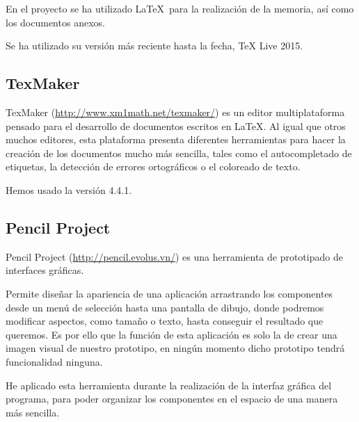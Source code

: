 En el proyecto se ha utilizado \LaTeX\ para la realización de la memoria, así como los documentos anexos.

Se ha utilizado su versión más reciente hasta la fecha, TeX Live 2015.

\subsection{TexMaker}

TexMaker (\url{http://www.xm1math.net/texmaker/}) es un editor multiplataforma pensado para el desarrollo de documentos escritos en \LaTeX . Al igual que otros muchos editores, esta plataforma presenta diferentes herramientas para hacer la creación de los documentos mucho más sencilla, tales como el autocompletado de etiquetas, la detección de errores ortográficos o el coloreado de texto.

Hemos usado la versión 4.4.1.

\subsection{Pencil Project}

Pencil Project (\url{http://pencil.evolus.vn/}) es una herramienta de prototipado de interfaces gráficas.

Permite diseñar la apariencia de una aplicación arrastrando los componentes desde un menú de selección hasta una pantalla de dibujo, donde podremos modificar aspectos, como tamaño o texto, hasta conseguir el resultado que queremos. Es por ello que la función de esta aplicación es solo la de crear una imagen visual de nuestro prototipo, en ningún momento dicho prototipo tendrá funcionalidad ninguna.

He aplicado esta herramienta durante la realización de la interfaz gráfica del programa, para poder organizar los componentes en el espacio de una manera más sencilla.

